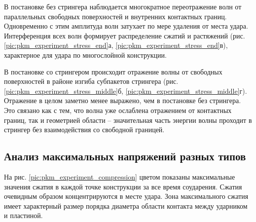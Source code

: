 В постановке без стрингера наблюдается многократное переотражение волн от параллельных свободных поверхностей и внутренних контактных границ. Одновременно с этим амплитуда волн затухает по мере удаления от места удара. Интерференция всех волн формирует распределение сжатий и растяжений (рис. \ref{pic:pkm_experiment_stress_end}а, \ref{pic:pkm_experiment_stress_end}в), характерное для удара по многослойной конструкции.

В постановке со стрингером происходит отражение волны от свободных поверхностей в районе изгиба субпакетов стрингера (рис. \ref{pic:pkm_experiment_stress_middle}б, \ref{pic:pkm_experiment_stress_middle}г). Отражение в целом заметно менее выражено, чем в постановке без стрингера. Это связано как с тем, что волна уже ослаблена отражением от контактных границ, так и геометрией области -- значительная часть энергии волны проходит в стрингер без взаимодействия со свободной границей.

\clearpage
\newpage

\subsection{Анализ максимальных напряжений разных типов}

На рис. \ref{pic:pkm_experiment_compression} цветом показаны максимальные значения сжатия в каждой точке конструкции за все время соударения. Сжатия очевидным образом концентрируются в месте удара. Зона максимального сжатия имеет характерный размер порядка диаметра области контакта между ударником и пластиной.

